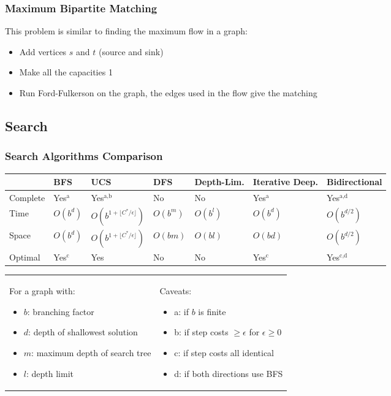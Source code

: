 \documentclass[a4paper, 12pt]{article}
\begin{document}
    \subsubsection{Maximum Bipartite Matching}

This problem is similar to finding the maximum flow in a graph:
\begin{itemize}
  \item Add vertices $s$ and $t$ (source and sink)
	\item Make all the capacities 1
	\item Run Ford-Fulkerson on the graph, the edges used in the flow give the matching
\end{itemize}

  \subsection{Search}

    \subsubsection{Search Algorithms Comparison}

\begin{tabular}{|l|l|l|l|l|l|l|}
  \cline{2-7}
  \multicolumn{1}{c|}{} & BFS & UCS & DFS & Depth-Lim. & Iterative Deep. & Bidirectional\\ \hline
  Complete & Yes$^\text{a}$ & Yes$^\text{a,b}$ & No & No & Yes$^\text{a}$ & Yes$^\text{a,d}$\\ \hline
  Time & $O(b^d)$ & $O(b^{1+\lfloor C^*/\epsilon\rfloor})$ & $O(b^m)$ & $O(b^l)$ & $O(b^d)$ & $O(b^{d/2})$\\ \hline
  Space & $O(b^d)$ & $O(b^{1+\lfloor C^*/\epsilon\rfloor})$ & $O(bm)$ & $O(bl)$ & $O(bd)$ & $O(b^{d/2})$\\ \hline
  Optimal & Yes$^\text{c}$ & Yes & No & No & Yes$^\text{c}$ & Yes$^\text{c,d}$\\ \hline
\end{tabular}

\vspace{0.5cm}

\begin{tabular}{p{8cm}p{7cm}}
For a graph with: \begin{itemize}
  \item $b$: branching factor
  \item $d$: depth of shallowest solution
  \item $m$: maximum depth of search tree
  \item $l$: depth limit
\end{itemize} & Caveats: \begin{itemize}
  \item a: if $b$ is finite
  \item b: if step costs $\ge\epsilon$ for $\epsilon \ge 0$
  \item c: if step costs all identical
  \item d: if both directions use BFS
\end{itemize}
\end{tabular}
\end{document}
